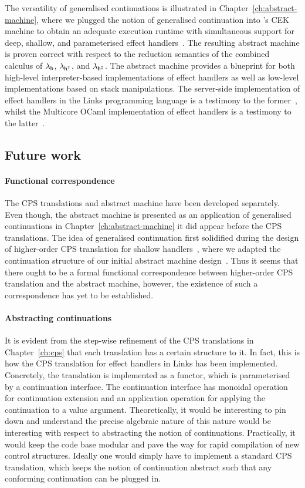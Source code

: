 \documentclass[12pt,phd,lfcs,twoside,openright,logo,leftchapter,normalheadings]{infthesis}
\theoremstyle{plain}
\theoremstyle{definition}
\begin{document}
The versatility of generalised continuations is illustrated in
Chapter~\ref{ch:abstract-machine}, where we plugged the notion of
generalised continuation into \citeauthor{FelleisenF86}'s CEK machine
to obtain an adequate execution runtime with simultaneous support for
deep, shallow, and parameterised effect
handlers~\cite{FelleisenF86}. The resulting abstract machine is proven
correct with respect to the reduction semantics of the combined
calculus of $\lambda_{\mathsf{h}}$, $\lambda_{\mathsf{h^\dagger}}$, and $\lambda_{\mathsf{h^{\ddagger}}}$. The abstract machine
provides a blueprint for both high-level interpreter-based
implementations of effect handlers as well as low-level
implementations based on stack manipulations. The server-side
implementation of effect handlers in the Links programming language is
a testimony to the former~\cite{HillerstromL16}, whilst the Multicore
OCaml implementation of effect handlers is a testimony to the
latter~\cite{SivaramakrishnanDWKJM21}.

\subsection{Future work}

\paragraph{Functional correspondence} The CPS translations and
abstract machine have been developed separately. Even though, the
abstract machine is presented as an application of generalised
continuations in Chapter~\ref{ch:abstract-machine} it did appear
before the CPS translations. The idea of generalised continuation
first solidified during the design of higher-order CPS translation for
shallow handlers~\cite{HillerstromL18}, where we adapted the
continuation structure of our initial abstract machine
design~\cite{HillerstromL16}. Thus it seems that there ought to be a
formal functional correspondence between higher-order CPS translation
and the abstract machine, however, the existence of such a
correspondence has yet to be established.

\paragraph{Abstracting continuations} It is evident from the step-wise
refinement of the CPS translations in Chapter~\ref{ch:cps} that each
translation has a certain structure to it.
%
In fact, this is how the CPS translation for effect handlers in Links
has been implemented. Concretely, the translation is implemented as a
functor, which is parameterised by a continuation interface. The
continuation interface has monoidal operation for continuation
extension and an application operation for applying the continuation
to a value argument. Theoretically, it would be interesting to pin
down and understand the precise algebraic nature of this nature would
be interesting with respect to abstracting the notion of
continuations. Practically, it would keep the code base modular and
pave the way for rapid compilation of new control structures. Ideally
one would simply have to implement a standard CPS translation, which
keeps the notion of continuation abstract such that any conforming
continuation can be plugged in.
\end{document}
